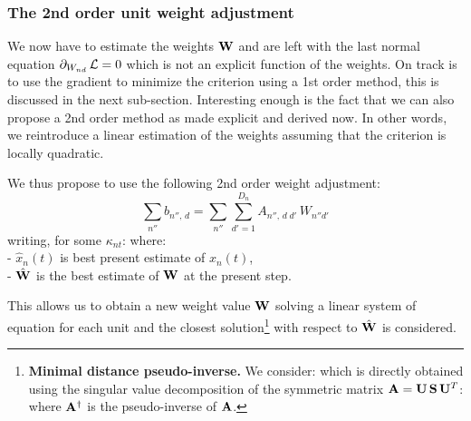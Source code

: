 \subsubsection*{The 2nd order unit weight adjustment}

We now have to estimate the weights ${\bf W}$ and are left with the last normal equation $\partial_{W_{nd}}\, {\cal L} = 0$ which is not an explicit function of the weights. On track is to use the gradient to minimize the criterion using a 1st order method, this is discussed in the next sub-section. Interesting enough is the fact that we can also propose a 2nd order method as made explicit and derived now. In other words, we reintroduce a linear estimation of the weights assuming that the criterion is locally quadratic.

We thus propose to use the following 2nd order weight adjustment:
\begin{equation} \label{2nd-order}
\sum_{n''} b_{n'',\,d} = \sum_{n''} \sum_{d'=1}^{D_{n}} A_{n'',\,d\;d'} \, W_{n''d'}
\end{equation}
writing, for some $\kappa_{nt}$: 
where:
\\- $\hat{x}_n(t)$ is best present estimate of $x_n(t)$,
\\- $\hat{\bf W}$ is the best estimate of ${\bf W}$ at the present step.

This allows us to obtain a new weight value ${\bf W}$ solving a linear system of equation for each unit and the closest solution\footnote{{\bf Minimal distance pseudo-inverse.} We consider: 
which is directly obtained using the singular value decomposition of the symmetric matrix ${\bf A} = {\bf U} \, {\bf S} \, {\bf U}^T$:
where ${\bf A}^\dagger$ is the pseudo-inverse of ${\bf A}$.\hr} with respect to $\hat{\bf W}$ is considered.

